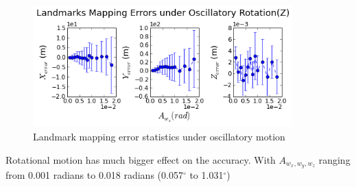 \begin{figure}[h]
  \includegraphics[width=10cm, keepaspectratio=true]{./Figures/SimulationFigures/Figure24.png}
  \caption{Landmark mapping error statistics under oscillatory motion}
  \label{fig:simfig20-24}
\end{figure}

Rotational motion has much bigger effect on the accuracy. With
$A_{w_x, w_y, w_z}$ ranging from 0.001 radians to 0.018
radians (0.057$^\circ$ to 1.031$^\circ$)

